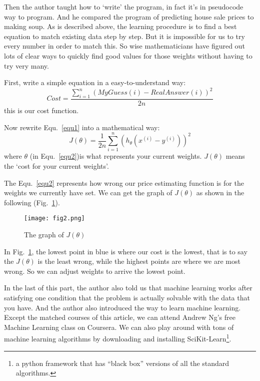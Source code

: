 \documentclass[a4paper,12pt,twocolumn]{article}
\begin{document}
\par
Then the author taught how to `write' the program, in fact it's in pseudocode way to program. And he compared the program of predicting house sale prices to making soup. As is described above,  the learning procedure is to find a best equation to match existing data step by step. But it is impossible for us to try every number in order to match this. So wise mathematicians have figured out lots of clear ways to quickly find good values for those weights without having to try very many.
\par
First, write a simple equation in a easy-to-understand way:
\begin{equation}
	Cost = \dfrac{\sum\limits_{i=1}^{n}(MyGuess(i) - RealAnswer(i))^{2}}{2n} \label{equ1}
\end{equation}
this is our cost function.
\par
Now rewrite Equ.~\ref{equ1} into a mathematical way:
\begin{equation}
	J(\theta) = \dfrac{1}{2n} \sum\limits_{i=1}^{n}(h_\theta (x^{(i)}-y^{(i)}))^2 \label{equ2}
\end{equation}
where $\theta$ (in Equ.~\ref{equ2})is what represents your current weights. $J(\theta)$ means the `cost for your current weights'.
\par
The Equ.~\ref{equ2} represents how wrong our price estimating function is for the weights we currently have set. We can get the graph of $J(\theta)$ as shown in the following (Fig.~\ref{fig2}).
\begin{figure}[h]
	\centering
	\texttt{[image: fig2.png]}
	\caption{The graph of $J(\theta)$} \label{fig2}
\end{figure}
In Fig.~\ref{fig2}, the lowest point in blue is where our cost is the lowest, that is to say the $J(\theta)$ is the least wrong, while the highest points are where we are most wrong. So we can adjust weights to arrive the lowest point.
\par
In the last of this part, the author also told us that machine learning works after satisfying one condition that the problem is actually solvable with the data that you have. And the author also introduced the way to learn machine learning. Except the matched courses of this article, we can attend Andrew Ng's free Machine Learning class on Coursera. We can also play around with tons of machine learning algorithms by downloading and installing SciKit-Learn\footnote{a python framework that has ``black box'' versions of all the standard algorithms.}.


\end{document}
